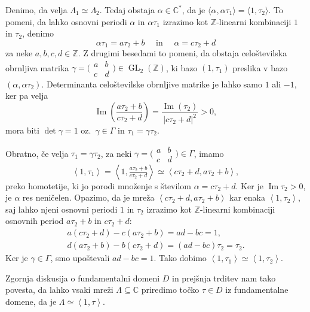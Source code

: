 \documentclass[mat1]{fmfdelo}
\numberwithin{equation}{section}
\newcommand{\Z}{\mathbb Z}
\newcommand{\C}{\mathbb C}
\newcommand{\CM}{\mathbb C ^*}
\newcommand{\SL}{\Gamma}
\newcommand{\abcd}{\big(\begin{smallmatrix} a & b\\c & d \end{smallmatrix}\big)}
\newcommand{\htp}{\simeq}
\newcommand{\abs}[1]{\left\lvert #1 \right\rvert}
\newcommand{\lattice}[2]{\left\langle #1, #2 \right\rangle}
\renewcommand\Im{\operatorname{Im}}%
\newcommand{\oz}{oz.\ }
\DeclareMathOperator{\GL}{GL}
\theoremstyle{definition}
\begin{document}
\begin{dokaz}
    Denimo, da velja $\Lambda_1 \htp \Lambda_2$. Tedaj obstaja $\alpha \in \CM$, da je $\langle \alpha, \alpha\tau_1 \rangle = \langle 1, \tau_2 \rangle$. To pomeni, da lahko osnovni periodi $\alpha$ in $\alpha\tau_1$ izrazimo kot $\Z$-linearni kombinaciji $1$ in $\tau_2$, denimo 
    \[
        \alpha\tau_1 = a\tau_2 + b \quad \text{ in } \quad \alpha = c\tau_2 + d  
    \]
    za neke $a, b, c, d \in \Z$. Z drugimi besedami to pomeni, da obstaja celoštevilska obrnljiva matrika $\gamma = \abcd \in \GL_2(\Z)$, ki bazo $(1,\tau_1)$ preslika v bazo $(\alpha, \alpha\tau_2)$. Determinanta celoštevilske obrnljive matrike je lahko samo $1$ ali $-1$, ker pa velja 
    \[
        \Im\left(\frac{a\tau_2 + b}{c\tau_2 + d}\right) = 
        \frac{\Im(\tau_2)}{\abs{c\tau_2 + d}^2}> 0,
    \]
    mora biti $\det\gamma = 1$ \oz $\gamma \in \SL$ in $\tau_1 = \gamma\tau_2$.
    

    Obratno, če velja $\tau_1 = \gamma\tau_2$, za neki $\gamma = \abcd \in \SL$, imamo
    \[
        \lattice{1}{\tau_1} = 
        \lattice{1}{\tfrac{a\tau_2 + b}{c\tau_2 + d}} \htp
        \lattice{c\tau_2 + d}{a\tau_2 + b},
    \]
    preko homotetije, ki jo porodi množenje s številom $\alpha = c\tau_2 + d$. Ker je $\Im\tau_2 > 0$, je $\alpha$ res neničelen. Opazimo, da je mreža $\lattice{c\tau_2 + d}{a\tau_2 + b}$ kar enaka $\lattice{1}{\tau_2}$, saj lahko njeni osnovni periodi $1$ in $\tau_2$ izrazimo kot $\Z$-linearni kombinaciji osnovnih period $a\tau_2 + b$ in $c\tau_2 + d$:
    \begin{gather*}
        a(c\tau_2 + d) - c(a\tau_2 + b) = ad - bc = 1, \\
        d(a\tau_2 + b) - b(c\tau_2 + d) = (ad - bc)\tau_2 = \tau_2.
    \end{gather*}
    Ker je $\gamma \in \SL$, smo upoštevali $ad - bc = 1$. Tako dobimo $\lattice{1}{\tau_1} \htp \lattice{1}{\tau_2}$.
\end{dokaz}

Zgornja diskusija o fundamentalni domeni $D$ in prejšnja trditev nam tako povesta, da lahko vsaki mreži $\Lambda \subseteq \C$ priredimo točko $\tau \in D$ iz fundamentalne domene, da je $\Lambda \htp \lattice{1}{\tau}$.
\end{document}
